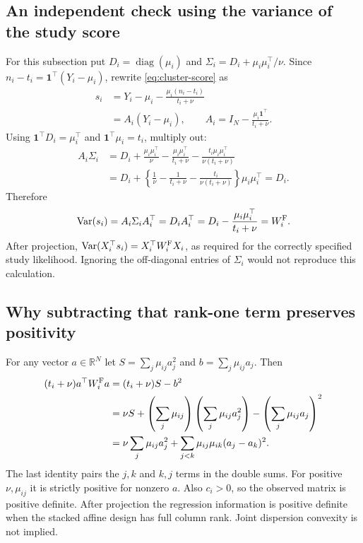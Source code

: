 \documentclass[11pt,a4paper]{article}
\newcommand{\R}{\mathbb R}
\newcommand{\Var}{\operatorname{Var}}
\newcommand{\diag}{\operatorname{diag}}
\numberwithin{equation}{section}
\begin{document}
\subsection{An independent check using the variance of the study score}
For this subsection put $D_i=\diag(\mu_i)$ and
$\Sigma_i=D_i+\mu_i\mu_i^\top/\nu$.
Since $n_i-t_i=\mathbf1^\top(Y_i-\mu_i)$, rewrite
\eqref{eq:cluster-score} as
\begin{align}
 s_i
 &=Y_i-\mu_i-\frac{\mu_i(n_i-t_i)}{t_i+\nu}\\
 &=A_i(Y_i-\mu_i),\qquad
 A_i=I_N-\frac{\mu_i\mathbf1^\top}{t_i+\nu}.
\end{align}
Using $\mathbf1^\top D_i=\mu_i^\top$ and
$\mathbf1^\top\mu_i=t_i$, multiply out:
\begin{align}
 A_i\Sigma_i
 &=D_i+\frac{\mu_i\mu_i^\top}{\nu}
       -\frac{\mu_i\mu_i^\top}{t_i+\nu}
       -\frac{t_i\mu_i\mu_i^\top}{\nu(t_i+\nu)}\\
 &=D_i+
   \left\{\frac1\nu-\frac1{t_i+\nu}
                        -\frac{t_i}{\nu(t_i+\nu)}\right\}
             \mu_i\mu_i^\top=D_i.
\end{align}
Therefore
\[
 \Var(s_i)=A_i\Sigma_i A_i^\top
      =D_iA_i^\top
      =D_i-\frac{\mu_i\mu_i^\top}{t_i+\nu}=W_i^{\rm F}.
\]
After projection, $\Var(X_i^\top s_i)=X_i^\top W_i^{\rm F}X_i$,
as required for the correctly specified study likelihood.
Ignoring the off-diagonal entries of $\Sigma_i$ would not reproduce
this calculation.

\subsection{Why subtracting that rank-one term preserves positivity}
For any vector $a\in\R^N$ let $S=\sum_j\mu_{ij}a_j^2$ and
$b=\sum_j\mu_{ij}a_j$. Then
\begin{align}
 (t_i+\nu)a^\top W_i^{\rm F}a
 &=(t_i+\nu)S-b^2\\
 &=\nu S+\left(\sum_j\mu_{ij}\right)
                     \left(\sum_j\mu_{ij}a_j^2\right)
                  -\left(\sum_j\mu_{ij}a_j\right)^2\\
 &=\nu\sum_j\mu_{ij}a_j^2
       +\sum_{j<k}\mu_{ij}\mu_{ik}(a_j-a_k)^2.
\end{align}
The last identity pairs the $j,k$ and $k,j$ terms in the double sums.
For positive $\nu,\mu_{ij}$ it is strictly positive for nonzero $a$.
Also $c_i>0$, so the observed matrix is positive definite.
After projection the regression information is positive definite when
the stacked affine design has full column rank. Joint dispersion
convexity is not implied.
\end{document}
